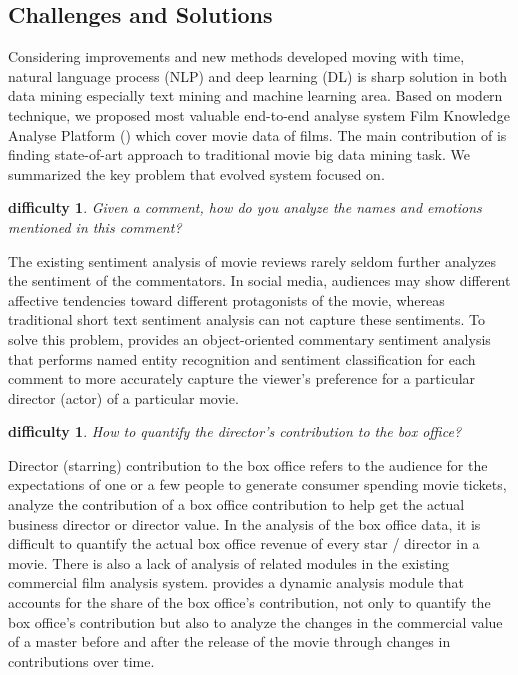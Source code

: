 \subsection{Challenges and Solutions}
Considering improvements and new methods developed moving with time, natural language process (NLP) and deep learning (DL) is sharp solution in both data mining especially text mining and machine learning area. Based on modern technique, we proposed most valuable end-to-end analyse system Film Knowledge Analyse Platform (\system) which cover movie data of films. The main contribution of \system is finding state-of-art approach to traditional movie big data mining task. We summarized the key problem that evolved system \system focused on.
\newtheorem{difficulties}[theorem]{difficulty}
\begin{difficulties}
Given a comment, how do you analyze the names and emotions mentioned in this comment? \end{difficulties}
\par The existing sentiment analysis of movie reviews rarely seldom further analyzes the sentiment of the commentators. In social media, audiences may show different affective tendencies toward different protagonists of the movie, whereas traditional short text sentiment analysis can not capture these sentiments. To solve this problem, \system provides an object-oriented commentary sentiment analysis that performs named entity recognition and sentiment classification for each comment to more accurately capture the viewer's preference for a particular director (actor) of a particular movie.
\begin{difficulties}
How to quantify the director's contribution to the box office?
\end{difficulties}
\par Director (starring) contribution to the box office refers to the audience for the expectations of one or a few people to generate consumer spending movie tickets, analyze the contribution of a box office contribution to help get the actual business director or director value. In the analysis of the box office data, it is difficult to quantify the actual box office revenue of every star / director in a movie. There is also a lack of analysis of related modules in the existing commercial film analysis system.
\system provides a dynamic analysis module that accounts for the share of the box office's contribution, not only to quantify the box office's contribution but also to analyze the changes in the commercial value of a master before and after the release of the movie through changes in contributions over time.
